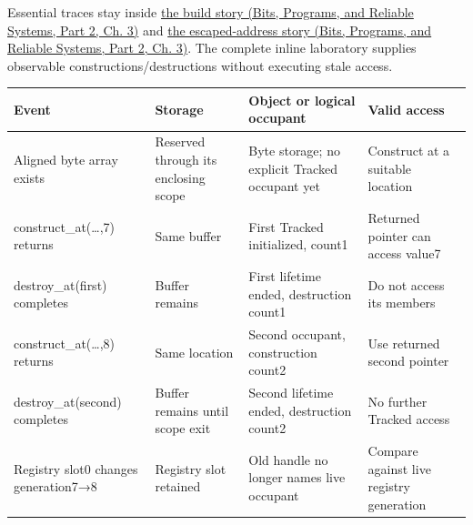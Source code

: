 \hypertarget{appendix-92ff77d4dfdc-c---build-and-occupant-trace-navigation}{}

Essential traces stay inside \href{../01-Bits-Programs-and-Reliable-Systems-P02/main.pdf\#nameddest=01-foundations-i-ch003-following-one-call-through-the-build}{the build story (Bits, Programs, and Reliable Systems, Part 2, Ch. 3)} and \href{../01-Bits-Programs-and-Reliable-Systems-P02/main.pdf\#nameddest=01-foundations-i-ch003-following-an-escaped-address-through-time}{the escaped-address story (Bits, Programs, and Reliable Systems, Part 2, Ch. 3)}. The complete inline laboratory supplies observable constructions/destructions without executing stale access.

{\def\LTcaptype{none} %
\begin{longtable}[]{@{}
  >{\raggedright\arraybackslash}p{}
  >{\raggedright\arraybackslash}p{}
  >{\raggedright\arraybackslash}p{}
  >{\raggedright\arraybackslash}p{}@{}}
\toprule\noalign{}
\begin{minipage}[b]{\linewidth}\raggedright
Event
\end{minipage} & \begin{minipage}[b]{\linewidth}\raggedright
Storage
\end{minipage} & \begin{minipage}[b]{\linewidth}\raggedright
Object or logical occupant
\end{minipage} & \begin{minipage}[b]{\linewidth}\raggedright
Valid access
\end{minipage} \\
\midrule\noalign{}
\endhead
\bottomrule\noalign{}
\endlastfoot
Aligned byte array exists & Reserved through its enclosing scope & Byte storage; no explicit Tracked occupant yet & Construct at a suitable location \\
construct\_at(\ldots,7) returns & Same buffer & First Tracked initialized, count1 & Returned pointer can access value7 \\
destroy\_at(first) completes & Buffer remains & First lifetime ended, destruction count1 & Do not access its members \\
construct\_at(\ldots,8) returns & Same location & Second occupant, construction count2 & Use returned second pointer \\
destroy\_at(second) completes & Buffer remains until scope exit & Second lifetime ended, destruction count2 & No further Tracked access \\
Registry slot0 changes generation7→8 & Registry slot retained & Old handle no longer names live occupant & Compare against live registry generation \\
\end{longtable}
}

